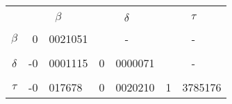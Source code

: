 		

		\begin{tabular}{cr@{.}lr@{.}lr@{.}l}
		& \multicolumn{2}{c}{ } & \multicolumn{2}{c}{ } & \multicolumn{2}{c}{ } \\
		& \multicolumn{2}{c}{{\bf{$\beta$}}} & \multicolumn{2}{c}{{\bf{$\delta$}}} & \multicolumn{2}{c}{{\bf{$\tau$}}} \\
		& \multicolumn{2}{c}{ } & \multicolumn{2}{c}{ } & \multicolumn{2}{c}{ } \\
		{\bf{$\beta$}} &			 0&0021051		&	\multicolumn{2}{c}{ - }		&  \multicolumn{2}{c}{ - }	\\
		& \multicolumn{2}{c}{ } & \multicolumn{2}{c}{ } & \multicolumn{2}{c}{ } \\
		 {\bf{$\delta$}} &			-0&0001115		&	0&0000071				& \multicolumn{2}{c}{ - } \\
		& \multicolumn{2}{c}{ } & \multicolumn{2}{c}{ } & \multicolumn{2}{c}{ } \\
		 {\bf{$\tau$}} &			-0&017678		&	0&0020210				& 1&3785176 \\
		\end{tabular}

